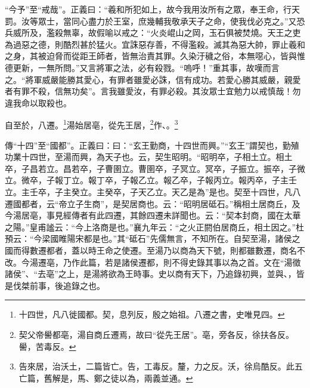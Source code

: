 {\noindent\shu{}\fzkt “今予”至“戒哉”。正義曰：“羲和所犯如上，故今我用汝所有之眾，奉王命，行天罰。汝等眾士，當同心盡力於王室，庶幾輔我敬承天子之命，使我伐必克之。”又恐兵威所及，濫殺無辜，故假喻以戒之：“火炎崐山之岡，玉石俱被焚燒。天王之吏為過惡之德，則酷烈甚於猛火。宜誅惡存善，不得濫殺。滅其為惡大帥，罪止羲和之身，其被迫脅而從距王師者，皆無治責其罪。久染汙穢之俗，本無噁心，皆與惟德更新，一無所問。”又言將軍之法，必有殺戮。“嗚呼！”重其事，故嘆而言之。“將軍威嚴能勝其愛心，有罪者雖愛必誅，信有成功。若愛心勝其威嚴，親愛者有罪不殺，信無功矣”。言我雖愛汝，有罪必殺。其汝眾士宜勉力以戒慎哉！勿違我命以取殺也。 \par}

自至於，八遷。\footnote{十四世，凡八徙國都。契，息列反，殷之始祖。八遷之書，史唯見四。}湯始居亳，從先王居，\footnote{契父帝嚳都亳，湯自商丘遷焉，故曰“從先王居”。亳，旁各反，徐扶各反。嚳，苦毒反。}作、。\footnote{告來居，治沃土，二篇皆亡。告，工毒反。釐，力之反。沃，徐烏酷反。此五亡篇，舊解是，馬、鄭之徒以為，兩義並通。}


{\noindent\zhuan{}\fzbyks 傳“十四”至“國都”。正義曰：曰：“玄王勤商，十四世而興。”“玄王”謂契也，勤殖功業十四世，至湯而興，為天子也。云，契生昭明。“昭明卒，子相土立。相土卒，子昌若立。昌若卒，子曹圉立。曹圉卒，子冥立。冥卒，子振立。振卒，子微立。微卒，子報丁立。報丁卒，子報乙立。報乙卒，子報丙立。報丙卒，子主壬立。主壬卒，子主癸立。主癸卒，子天乙立。天乙是為”是也。契至十四世，凡八遷國都者，云“帝立子生商”，是契居商也。云：“昭明居砥石。”稱相土居商丘，及今湯居亳，事見經傳者有此四遷，其餘四遷未詳聞也。云：“契本封商，國在太華之陽。”皇甫謐云：“今上洛商是也。”襄九年云：“之火正閼伯居商丘，相土因之。”杜預云：“今梁國睢陽宋都是也。”其“砥石”先儒無言，不知所在。自契至湯，諸侯之國而得數遷都者，蓋以時王命之使遷。至湯乃以商為天下號，則都雖數遷，商名不改。今湯遷亳，乃作此篇，若是諸侯遷都，則不得史錄其事以為之首。文在“湯徵諸侯”、“去亳”之上，是湯將欲為王時事。史以商有天下，乃追錄初興，並與、，皆是伐桀前事，後追錄之也。 \par}

